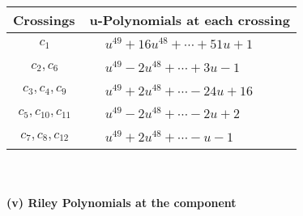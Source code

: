 \documentclass[1p]{elsarticle_modified}
\theoremstyle{definition}
\begin{document}
\begin{tabular}{m{50pt}|m{274pt}}
Crossings & \hspace{64pt}u-Polynomials at each crossing \\
\hline $$\begin{aligned}c_{1}\end{aligned}$$&$\begin{aligned}
&u^{49}+16 u^{48}+\cdots+51 u+1
\end{aligned}$\\
\hline $$\begin{aligned}c_{2},c_{6}\end{aligned}$$&$\begin{aligned}
&u^{49}-2 u^{48}+\cdots+3 u-1
\end{aligned}$\\
\hline $$\begin{aligned}c_{3},c_{4},c_{9}\end{aligned}$$&$\begin{aligned}
&u^{49}+2 u^{48}+\cdots-24 u+16
\end{aligned}$\\
\hline $$\begin{aligned}c_{5},c_{10},c_{11}\end{aligned}$$&$\begin{aligned}
&u^{49}-2 u^{48}+\cdots-2 u+2
\end{aligned}$\\
\hline $$\begin{aligned}c_{7},c_{8},c_{12}\end{aligned}$$&$\begin{aligned}
&u^{49}+2 u^{48}+\cdots- u-1
\end{aligned}$\\
\hline
\end{tabular}\\~\\
\newpage\renewcommand{\arraystretch}{1}
\flushleft \textbf{(v) Riley Polynomials at the component}\newline \\
\end{document}
